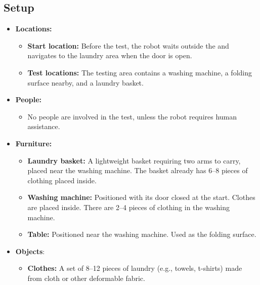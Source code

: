 \subsection*{Setup}
\begin{itemize}
    \item \textbf{Locations:}
        \begin{itemize}
            \item \textbf{Start location:} Before the test, the robot waits outside the \Arena{} and navigates to the laundry area when the door is open.
            \item \textbf{Test locations:} The testing area contains a washing machine, a folding surface nearby, and a laundry basket.
        \end{itemize}
    \item \textbf{People:}
        \begin{itemize}
            \item No people are involved in the test, unless the robot requires human assistance.
        \end{itemize}
    \item \textbf{Furniture:}
        \begin{itemize}
			\item \textbf{Laundry basket:} A lightweight basket requiring two arms to carry, placed near the washing machine. The basket already has 6--8 pieces of clothing placed inside.
            \item \textbf{Washing machine:} Positioned with its door closed at the start. Clothes are placed inside. There are 2--4 pieces of clothing in the washing machine.
            \item \textbf{Table:} Positioned near the washing machine. Used as the folding surface.
        \end{itemize}
    \item \textbf{Objects}:
        \begin{itemize}
            \item \textbf{Clothes:} A set of 8--12 pieces of laundry (e.g., towels, t-shirts) made from cloth or other deformable fabric.
        \end{itemize}
\end{itemize}


